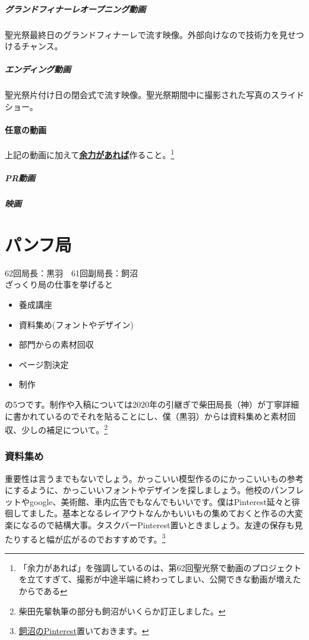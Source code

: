 \documentclass[dvipdfmx,jb5]{jarticle}
\newcommand{\impact}[1]{\textbf{\gtfamily #1}}
\begin{document}
  \subsubsection{グランドフィナーレオープニング動画}
  聖光祭最終日のグランドフィナーレで流す映像。外部向けなので技術力を見せつけるチャンス。
  \subsubsection{エンディング動画}
  聖光祭片付け日の閉会式で流す映像。聖光祭期間中に撮影された写真のスライドショー。
 \subsection{任意の動画}
  上記の動画に加えて\underline{\impact{余力があれば}}作ること。\footnote{「余力があれば」を強調しているのは、第62回聖光祭で動画のプロジェクトを立てすぎて、撮影が中途半端に終わってしまい、公開できな動画が増えたからである}
  \subsubsection{PR動画}
  \subsubsection{映画}
 \newpage
 \part{パンフ局}
  62回局長：黒羽　61回副局長：飼沼\\
 ざっくり局の仕事を挙げると
 \begin{itemize}
   \item 養成講座
   \item 資料集め(フォントやデザイン)
   \item 部門からの素材回収
   \item ページ割決定
   \item 制作
 \end{itemize}

の5つです。制作や入稿については2020年の引継ぎで柴田局長（神）が丁寧詳細に書かれているのでそれを貼ることにし、僕（黒羽）からは資料集めと素材回収、少しの補足について。\footnote{柴田先輩執筆の部分も飼沼がいくらか訂正しました。}

\section{資料集め}
重要性は言うまでもないでしょう。かっこいい模型作るのにかっこいいもの参考にするように、かっこいいフォントやデザインを探しましょう。他校のパンフレットやgoogle、美術館、車内広告でもなんでもいいです。僕はPinterest延々と徘徊してました。基本となるレイアウトなんかもいいもの集めておくと作るの大変楽になるので結構大事。タスクバーPinterest置いときましょう。友達の保存も見たりすると幅が広がるのでおすすめです。\footnote{\href{https://www.pinterest.jp/mpse_}{飼沼のPinterest}置いておきます。}
\end{document}
